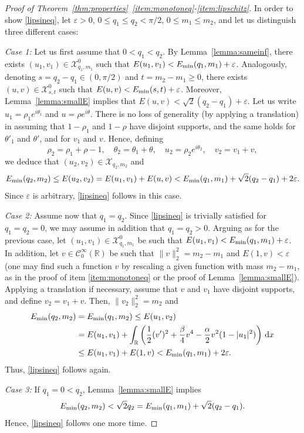 \documentclass[11pt]{article}
\newcommand{\R}{\mathbb{R}}
\newcommand{\boC}{\mathcal{C}}
\newcommand{\boX}{\mathcal{X}}
\newcommand{\Emin}{E_\textup{min}}
\renewcommand{\d}{\,\mathrm{d}}
\theoremstyle{plain}
\theoremstyle{definition}
\theoremstyle{remark}
\numberwithin{equation}{section}
\begin{document}
{\begin{proof}[Proof of Theorem~\ref{thm:properties}~\ref{item:monotoneq}-\ref{item:lipschitz}]
In order to show \eqref{lipsineq}, let $\varepsilon>0$, $0\leq q_1\leq q_2<\pi/2$, $0\leq m_1\leq m_2$, and let us distinguish three different cases:

\emph{Case 1:} Let us first assume that $0<q_1<q_2$. By Lemma~\ref{lemma:sameinf}, there exists $(u_1,v_1)\in\boX_{q_1,m_1}^0$ such that $E(u_1,v_1)<\Emin(q_1,m_1)+\varepsilon$. Analogously, denoting $s=q_2-q_1\in (0,\pi/2)$ and $t=m_2-m_1\geq 0$, there exists $(u,v)\in\boX_{s,t}^0$ such that $E(u,v)<\Emin(s,t)+\varepsilon$. Moreover, Lemma~\ref{lemma:smallE}  implies that $E(u,v)<\sqrt{2}(q_2-q_1)+\varepsilon$. Let us write $u_1=\rho_1 e^{i\theta_1}$ and $u=\rho e^{i\theta}$. There is no loss of generality (by applying a translation) in assuming that $1-\rho_1$ and $1-\rho$ have disjoint supports, and the same holds for $\theta'_1$ and $\theta'$, and for $v_1$ and $v$. Hence, defining 
\[\rho_2=\rho_1+\rho-1,\quad\theta_2=\theta_1+\theta,\quad u_2=\rho_2 e^{i\theta_2},\quad v_2=v_1+ v,\]
we deduce that $(u_2,v_2)\in \boX_{q_2,m_2}$ and
\[\Emin(q_2,m_2)\leq E(u_2,v_2)=E(u_1,v_1)+E(u,v)<\Emin(q_1,m_1)+\sqrt{2}(q_2-q_1)+2\varepsilon.\]
Since $\varepsilon$ is arbitrary, \eqref{lipsineq} follows in this case. 

\emph{Case 2:} Assume now that $q_1=q_2$. Since \eqref{lipsineq} is trivially satisfied for $q_1=q_2=0$, we may assume in addition that $q_1=q_2>0$. Arguing as for the previous case, let $(u_1,v_1)\in\boX_{q_1,m_1}^0$ be such that $E(u_1,v_1)<\Emin(q_1,m_1)+\varepsilon$. In addition, let $v\in\boC_0^\infty(\R)$ be such that $\|v\|_2^2=m_2-m_1$ and $E(1,v)<\varepsilon$ (one may find such a function $v$ by rescaling a given function with mass $m_2-m_1$, as in the proof of item \ref{item:monotoneq} or the proof of Lemma~\ref{lemma:smallE}). Applying a translation if necessary, assume that $v$ and $v_1$ have disjoint supports, and define $v_2=v_1+v$. Then, $\|v_2\|_2^2=m_2$ and
\begin{align*}
\Emin(q_2,m_2)&=\Emin(q_1,m_2)\leq E(u_1,v_2)
\\
&=E(u_1,v_1)+\int_\R\left(\frac12(v')^2+\frac{\beta}{4}v^4-\frac{\alpha}{2}v^2(1-|u_1|^2)\right)\d x
\\
&\leq E(u_1,v_1)+E(1,v)<\Emin(q_1,m_1)+2\varepsilon.    
\end{align*}
Thus, \eqref{lipsineq} follows again.

\emph{Case 3:} If $q_1=0<q_2$, {Lemma~\ref{lemma:smallE}} implies
\[\Emin(q_2,m_2)<\sqrt{2}q_2=\Emin(q_1,m_1)+\sqrt{2}(q_2-q_1).\]
Hence, \eqref{lipsineq} follows one more time.


\end{proof}}
\end{document}
